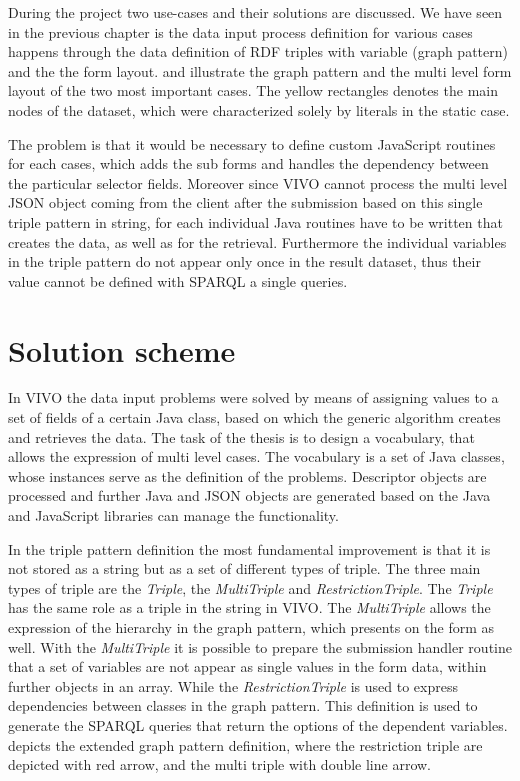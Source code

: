 During the project two use-cases and their solutions are discussed. We have seen in the previous chapter is the data input process definition for various cases happens through the data definition of RDF triples with variable (graph pattern) and the the form layout.  and  illustrate the graph pattern and the multi level form layout of the two most important cases. The yellow rectangles denotes the main nodes of the dataset, which were characterized solely by literals in the static case.



The problem is that it would be necessary to define custom JavaScript routines for each cases, which adds the sub forms and handles the dependency between the particular selector fields. Moreover since VIVO cannot process the multi level JSON object coming from the client after the submission based on this single triple pattern in string, for each individual Java routines have to be written that creates the data, as well as for the retrieval. Furthermore the individual variables in the triple pattern do not appear only once in the result dataset, thus their value cannot be defined with SPARQL a single queries.

\section{Solution scheme}

In VIVO the data input problems were solved by means of assigning values to a set of fields of a certain Java class, based on which the generic algorithm creates and retrieves the data. The task of the thesis is to design a vocabulary, that allows the expression of multi level cases. The vocabulary is a set of Java classes, whose instances serve as the definition of the problems. Descriptor objects are processed and further Java and JSON objects are generated based on the Java and JavaScript libraries can manage the functionality.

In the triple pattern definition the most fundamental improvement is that it is not stored as a string but as a set of different types of triple. The three main types of triple are the \textit{Triple}, the \textit{MultiTriple} and \textit{RestrictionTriple}. The \textit{Triple} has the same role as a triple in the string in VIVO. The \textit{MultiTriple} allows the expression of the hierarchy in the graph pattern, which presents on the form as well. With the \textit{MultiTriple} it is possible to prepare the submission handler routine that a set of variables are not appear as single values in the form data, within further objects in an array. While the \textit{RestrictionTriple} is used to express dependencies between classes in the graph pattern. This definition is used to generate the SPARQL queries that return the options of the dependent variables.  depicts the extended graph pattern definition, where the restriction triple are depicted with red arrow, and the multi triple with double line arrow.

